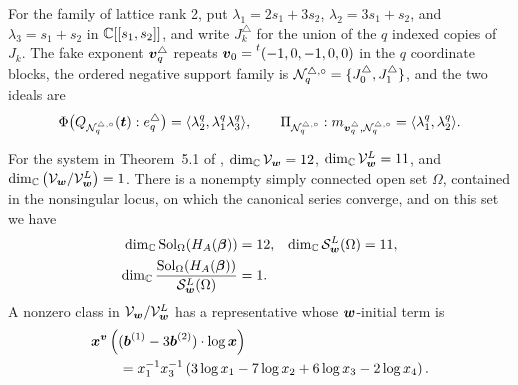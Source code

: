 For the family of lattice rank 2, put \(\lambda_1=2s_1+3s_2\), \(\lambda_2=3s_1+s_2\), and \(\lambda_3=s_1+s_2\) in \(\mathbb C[[s_1,s_2]]\), and write \(J_k^\triangle\) for the union of the \(q\) indexed copies of \(J_k\).
The fake exponent \(\boldsymbol{v}_q^\triangle\) repeats \(\boldsymbol{v}_0=\prescript{t}{}{(-1,0,-1,0,0)}\) in the \(q\) coordinate blocks, the ordered negative support family is \(\mathcal N_q^{\triangle,\circ}=\{J_0^\triangle,J_1^\triangle\}\), and the two ideals are
\begin{equation}
	\Phi\bigl(Q_{\mathcal N_q^{\triangle,\circ}}(\boldsymbol{t}):e_q^\triangle\bigr)=\langle\lambda_2^q,\lambda_1^q\lambda_3^q\rangle, \qquad \Pi_{\mathcal N_q^{\triangle,\circ}}:m_{\boldsymbol{v}_q^\triangle,\mathcal N_q^{\triangle,\circ}}=\langle\lambda_1^q,\lambda_2^q\rangle.
	\label{eq:family-ideals}
\end{equation}
\begin{corollary}
	\label{cor:lattice-counterexample-formal-codimension}
	For the system in Theorem~5.1 of \cite{Nak26}, \(\dim_{\mathbb C}\mathcal V_{\boldsymbol{w}}=12\), \(\dim_{\mathbb C}\mathcal V_{\boldsymbol{w}}^{L}=11\), and \(\dim_{\mathbb C} \left( \mathcal V_{\boldsymbol{w}}/\mathcal V_{\boldsymbol{w}}^{L} \right) =1\).
	There is a nonempty simply connected open set \(\Omega\), contained in the nonsingular locus, on which the canonical series converge, and on this set we have
	\[
		\begin{aligned}
			\dim_{\mathbb C}\operatorname{Sol}_{\Omega}(H_A(\boldsymbol{\beta}))
			&=12,
			&
			\dim_{\mathbb C}\mathcal S_{\boldsymbol{w}}^{L}(\Omega)
			&=11,\\
			\dim_{\mathbb C}
			\frac{\operatorname{Sol}_{\Omega}(H_A(\boldsymbol{\beta}))}
			{\mathcal S_{\boldsymbol{w}}^{L}(\Omega)}
			&=1.
		\end{aligned}
	\]
	A nonzero class in \(\mathcal V_{\boldsymbol{w}}/\mathcal V_{\boldsymbol{w}}^{L}\) has a representative whose \(\boldsymbol{w}\)-initial term is
	\[
		\begin{aligned}
			&\boldsymbol{x}^{\boldsymbol{v}}
			\left(
			(\boldsymbol{b}^{(1)}-3\boldsymbol{b}^{(2)})\cdot\log\boldsymbol{x}
			\right)\\
			&\qquad
			=x_1^{-1}x_3^{-1}
			\left(
			3\log x_1-7\log x_2+6\log x_3-2\log x_4
			\right).
		\end{aligned}
	\]
\end{corollary}

